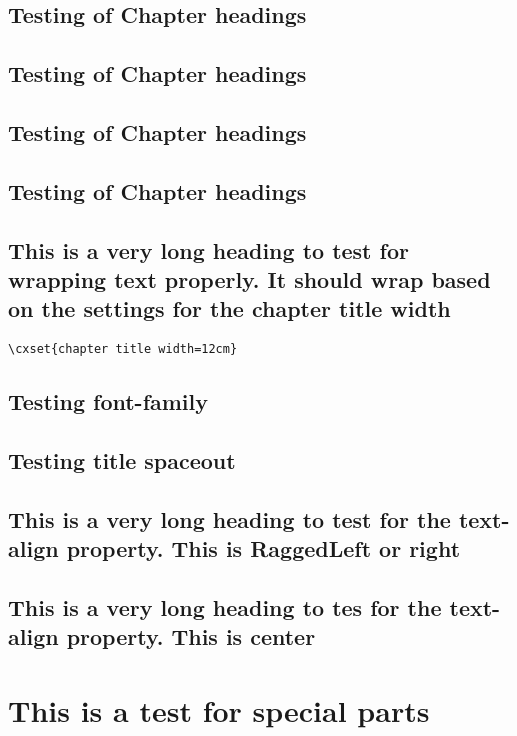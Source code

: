 

\chapter{Testing of Chapter headings}

\chapter{Testing of Chapter headings}

\chapter{Testing of Chapter headings}

\chapter{Testing of Chapter headings}


\chapter{This is a very long heading to test for wrapping text properly. It should wrap based on the settings for the chapter title width}

\begin{verbatim}
\cxset{chapter title width=12cm}
\end{verbatim}

\chapter{Testing font-family}

          
\chapter{Testing title spaceout}

          
\chapter{This is a very long heading to test for the text-align property. This is RaggedLeft or right}

          
\chapter{This is a very long heading to tes for the text-align property. This is center}

\part{This is a test for special parts}





